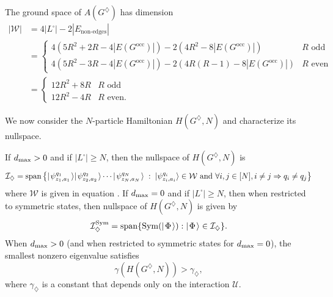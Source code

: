 \documentclass[../thesis-main/thesis-main]{subfiles}
\begin{document}
The ground space of $A(G^{\diamondsuit})$ has dimension 
\begin{align}
|\mathcal{W}|&=4\big|L^{\square}\big|  -2\left|E_{\text{non-edges}}\right|\\
&=\begin{cases}
4\left(5R^{2}+2R-4|E(G^{\text{occ}})|\right)-2\left(4R^{2}-8|E(G^{\text{occ}})|\right) & R\text{ odd}\\
4\left(5R^{2}-3R-4|E(G^{\text{occ}})|\right)-2\left(4R(R-1)-8|E(G^{\text{occ}})|\right) & R\text{ even}
\end{cases} \\
&= \begin{cases}
12R^{2}+8R & R\text{ odd}\\
12R^{2}-4R & R\text{ even}.
\end{cases}\label{eq:num_basis_W}
\end{align}

We now consider the $N$-particle Hamiltonian $H(G^{\diamondsuit},N)$ and characterize its nullspace.

\begin{lemma}
\label{lem:The-nullspace-of_Hdiamond} If $d_{\text{max}} >0$ and if $|L^\square| \geq N$, then the nullspace of $H(G^{\diamondsuit},N)$ is 
\begin{equation}
  \mathcal{I}_{\diamondsuit}= \operatorname{span} \big\{ |\mspace{2mu} \psi_{z_1,a_1}^{q_1} \mspace{2mu} \rangle |\mspace{2mu} \psi_{z_2,a_2}^{q_2} \mspace{2mu} \rangle \cdots |\mspace{2mu} \psi_{z_N,a_N}^{q_N} \mspace{2mu} \rangle\; : \; |\psi_{z_{i},a_{i}}^{q_{i}}\rangle\in\mathcal{W}\text{ and } \forall i,j\in [N], i\neq j \Rightarrow q_{i}\neq q_{j} \big\}
\end{equation}
where $\mathcal{W}$ is given in equation .  If $d_{\text{max}} = 0$ and if $|L^\square|\geq N$, then when restricted to symmetric states, then nullspace of $H(G^{\diamondsuit},N)$ is given by
\begin{equation}
  \mathcal{I}_{\diamondsuit}^{\operatorname{Sym}}=\operatorname{span}\{ \operatorname{Sym}( |\mspace{2mu} \Phi \mspace{2mu} \rangle) : |\mspace{2mu} \Phi \mspace{2mu} \rangle \in \mathcal{I}_{\diamondsuit}\}.
\end{equation} 
When $d_{\text{max}} >0$ (and when restricted to symmetric states for $d_{\text{max}} = 0$), the smallest nonzero eigenvalue satisfies 
\begin{equation}
  \gamma(H(G^{\diamondsuit},N)) > \gamma_{\diamondsuit},
\end{equation}
where $\gamma_{\diamondsuit}$ is a constant that depends only on the interaction $\mathcal{U}$.
\end{lemma}
\end{document}
